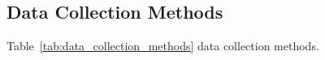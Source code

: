 \fi %

\label{sec:data_operationalisation}
\label{tab:data_analysis_chain}
\label{tab:data_collection_methods}
\label{tab:analytical_purpose}
\label{tab:operationalisation}
\label{tab:concept_to_analysis}

\iffalse %
\subsection{Data Collection Methods}

\iffalse %
\noindent Table~\ref{tab:data_collection_methods} data collection methods.

